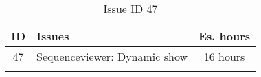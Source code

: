 \begin{longtable} { | c | p{12cm} | c | } 
\hline
	ID 	&	Issues	&		 Es. hours \\\hline
	 47	&	Sequenceviewer: Dynamic show	&	16 hours \\\hline
\caption{Issue ID 47}
\label{tab:spr3_SVdynamicshow}
\end{longtable}
